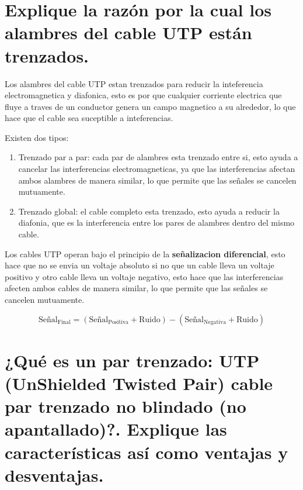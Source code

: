 \documentclass[a4paper,12pt]{article}
\begin{document}
\renewcommand{\footrulewidth}{0.4pt}  %

\setcounter{page}{1}

\tableofcontents

\newpage

\section{Explique la razón por la cual los alambres del cable UTP están trenzados.}

Los alambres del cable UTP estan trenzados para reducir la inteferencia electromagnetica y diafonica, esto es por que cualquier corriente electrica que fluye a traves de un conductor genera un campo magnetico a su alrededor, lo que hace que el cable sea suceptible a inteferencias.

Existen dos tipos:

\begin{enumerate}
    \item Trenzado par a par: cada par de alambres esta trenzado entre si, esto ayuda a cancelar las interferencias electromagneticas, ya que las interferencias afectan ambos alambres de manera similar, lo que permite que las señales se cancelen mutuamente.
    \item Trenzado global: el cable completo esta trenzado, esto ayuda a reducir la diafonia, que es la interferencia entre los pares de alambres dentro del mismo cable.
\end{enumerate}

Los cables UTP operan bajo el principio de la \textbf{señalizacion diferencial}, esto hace que no se envia un voltaje absoluto si no que un cable lleva un voltaje positivo y otro cable lleva un voltaje negativo, esto hace que las interferencias afecten ambos cables de manera similar, lo que permite que las señales se cancelen mutuamente.

\[
\text{Señal}_{\text{Final}} = \left(\text{Señal}_{\text{Positiva}} + \text{Ruido}\right) - \left(\text{Señal}_{\text{Negativa}} + \text{Ruido}\right)
\]

\newpage

\section{¿Qué es un par trenzado: UTP (UnShielded Twisted Pair) cable par trenzado no blindado (no apantallado)?. Explique las características así como ventajas y desventajas.}
\end{document}
